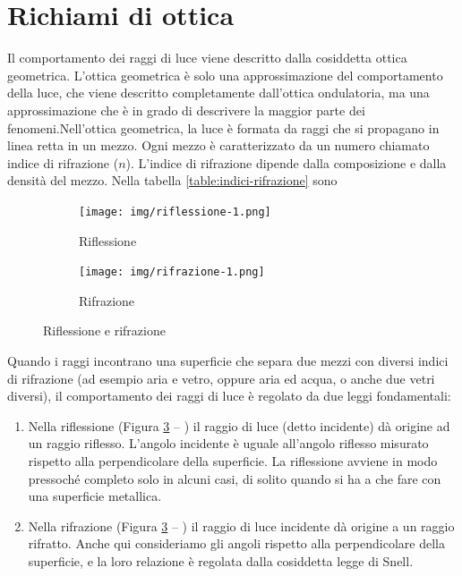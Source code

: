\section{Richiami di ottica}

Il comportamento dei raggi di luce viene descritto dalla cosiddetta ottica
geometrica. L'ottica geometrica è solo una approssimazione del comportamento
della luce, che viene descritto completamente dall'ottica ondulatoria, ma una
approssimazione che è in grado di descrivere la maggior parte dei
fenomeni.Nell'ottica geometrica, la luce è formata da raggi che si propagano
in linea retta in un mezzo. Ogni mezzo è caratterizzato da un numero chiamato
indice di rifrazione ($n$). L'indice di rifrazione dipende dalla composizione
e dalla densità del mezzo. Nella tabella \ref{table:indici-rifrazione} sono



\begin{figure}[!ht]
\begin{subfigure}[t]{.5\textwidth}
\centering
\caption{Riflessione}
\label{sub:riflessione}
\texttt{[image: img/riflessione-1.png]}

\end{subfigure}
\begin{subfigure}[t]{.5\textwidth}
\caption{Rifrazione}
\label{sub:rifrazione}
\centering
\texttt{[image: img/rifrazione-1.png]}


\end{subfigure}
\caption{Riflessione e rifrazione}
\label{fig:riflessione-rifrazione}
\end{figure}


Quando i raggi incontrano una superficie che separa due mezzi con diversi
indici di rifrazione (ad esempio aria e vetro, oppure aria ed acqua, o anche
due vetri diversi), il comportamento dei raggi di luce è regolato da due leggi
fondamentali:

\begin{enumerate}
\item Nella riflessione (Figura \ref{fig:riflessione-rifrazione} -- ) il raggio di luce (detto incidente) dà origine ad un raggio riflesso. L'angolo incidente è uguale all'angolo riflesso misurato rispetto alla perpendicolare della superficie. La
riflessione avviene in modo pressoché completo solo in alcuni casi, di solito quando si ha a che fare
con una superficie metallica.
\item Nella rifrazione (Figura \ref{fig:riflessione-rifrazione} -- ) il raggio di luce incidente dà origine a un raggio rifratto. Anche qui
consideriamo gli angoli rispetto alla perpendicolare della superficie, e la loro relazione è regolata
dalla cosiddetta legge di Snell.
\end{enumerate}


